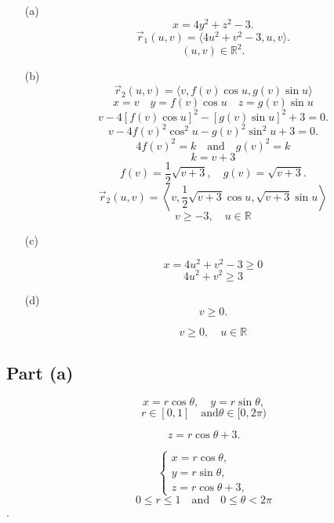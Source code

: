 \documentclass{report}
\begin{document}
\begin{enumerate}
    \item[(a)]
    \[ x = 4y^2 + z^2 - 3. \]    
    \[ \vec{r}_1(u, v) = \langle 4u^2 + v^2 - 3, u, v \rangle. \]    
    \[ (u, v) \in \mathbb{R}^2. \]
    
    \item[(b)] 
    \[ \vec{r}_2(u, v) = \langle v, f(v) \cos u, g(v) \sin u \rangle \] 
    \[ x = v \quad  y = f(v) \cos u \quad  z = g(v) \sin u \] 
    \[ v - 4\left[f(v) \cos u\right]^2 - \left[g(v) \sin u\right]^2 + 3 = 0. \]
    \[ v - 4f(v)^2 \cos^2 u - g(v)^2 \sin^2 u + 3 = 0. \]
    \[ 4f(v)^2 = k \quad \text{and} \quad g(v)^2 = k \]
    \[ k = v + 3 \]
    \[ f(v) = \frac{1}{2} \sqrt{v + 3}, \quad g(v) = \sqrt{v + 3}. \]    
    \[ \vec{r}_2(u, v) = \left\langle v, \frac{1}{2} \sqrt{v + 3} \cos u, \sqrt{v + 3} \sin u \right\rangle \]    
    \[ v \geq -3, \quad u \in \mathbb{R} \]
    
    \item[(c)] 
    
    \[ x = 4u^2 + v^2 - 3 \geq 0 \]    
    \[ 4u^2 + v^2 \geq 3 \]
        
    \item[(d)] 
    \[ v \geq 0. \]
        
    \[ v \geq 0, \quad u \in \mathbb{R} \]
\end{enumerate}



\subsection*{Part (a)}

    \[ x = r \cos\theta, \quad y = r \sin\theta, \]
    \[ r \in [0, 1] \quad  \text{and} \theta \in [0, 2\pi) \]

    \[ z = r \cos\theta + 3. \]

    \[ \begin{cases}
    x = r \cos\theta, \\
    y = r \sin\theta, \\
    z = r \cos\theta + 3,
    \end{cases} \]
    \[ 0 \leq r \leq 1 \quad  \text{and} \quad  0 \leq \theta < 2\pi \].
\end{document}
